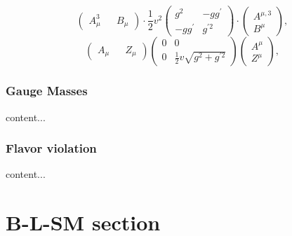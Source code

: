 \documentclass[10pt,xcolor=dvipsnames,mathserif]{beamer}
\begin{document}
\begin{frame}
\begin{equation}
\begin{pmatrix}
A_\mu^3 && B_\mu
\end{pmatrix} \cdot  \frac{1}{2} v^2 \begin{pmatrix}
g^2  & -g g^\prime \\
-g g^\prime & g^{\prime 2} 
\end{pmatrix} \cdot \begin{pmatrix}
A^{\mu,3} \\  B^\mu
\end{pmatrix}  , 
\end{equation} 
%
\begin{equation}
\begin{pmatrix}
A_\mu && Z_\mu 
\end{pmatrix} \begin{pmatrix}
0  & 0 \\
0  & \frac{1}{2} v \sqrt{g^2 + g^{\prime 2}} 
\end{pmatrix}  \begin{pmatrix}
A^\mu \\ Z^\mu
\end{pmatrix} , 
\end{equation}

\end{frame}

\begin{frame}

\end{frame}
	
	\begin{frame}
		\frametitle{Gauge Masses}
		content...
	\end{frame}
	
	\begin{frame}
		\frametitle{Flavor violation}
		content...
	\end{frame}
	
	\section{B-L-SM section} 
	
\end{document}

